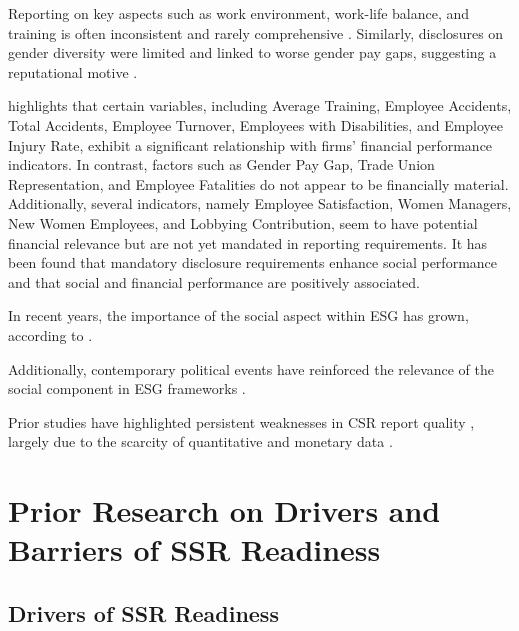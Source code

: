 Reporting on key aspects such as work environment, work-life balance, 
and training is often inconsistent and rarely comprehensive \parencite{Greig2021}. Similarly,
disclosures on gender diversity were limited and linked to worse gender pay gaps,
suggesting a reputational motive \parencite{Huang2022}.

\textcite{Bornar2025} highlights that certain variables, including Average Training, Employee Accidents, 
Total Accidents, Employee Turnover, Employees with Disabilities, and Employee Injury Rate, exhibit 
a significant relationship with firms' financial performance indicators. In contrast, factors such as Gender Pay Gap, 
Trade Union Representation, and Employee Fatalities do not appear to be financially material. Additionally, 
several indicators, namely Employee Satisfaction, Women Managers, New Women Employees, and Lobbying Contribution, 
seem to have potential financial relevance but are not yet mandated in reporting requirements.
It has been found that mandatory disclosure requirements enhance social performance and that social 
and financial performance are positively associated.

In recent years, the importance of the social aspect within ESG has grown, according to \textcite{BaidJayaraman2022}. 

Additionally, contemporary political events have reinforced the relevance of the social component in ESG frameworks 
\parencite{She2022}.

Prior studies have highlighted 
persistent weaknesses in CSR report quality \parencite{DiChiacchio2024}, largely due to the scarcity of 
quantitative and monetary data \parencite{Michelon2015}.

\section{Prior Research on Drivers and Barriers of SSR Readiness}

\subsection{Drivers of SSR Readiness}









